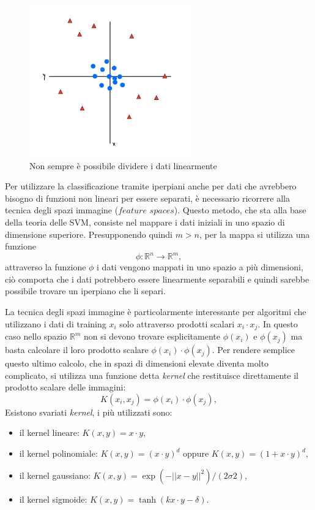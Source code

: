 \documentclass[12pt,italian]{report}
\begin{document}
\begin{figure}[h]
	\centering
	\includegraphics[width = 70mm]{immagini/nonLineare}
	\caption{Non sempre è possibile dividere i dati linearmente}
\end{figure}

Per utilizzare la classificazione tramite iperpiani anche per dati che avrebbero bisogno di funzioni non lineari per essere separati, è necessario ricorrere alla tecnica degli spazi immagine ($feature$ $spaces$). Questo metodo, che sta alla base della teoria delle SVM, consiste nel mappare i dati iniziali in uno spazio di dimensione superiore.  Presupponendo quindi $m > n$, per la mappa si utilizza una funzione
\begin{equation}
	\phi: \mathbb{R}^{n} \rightarrow \mathbb{R}^{m},
\end{equation}
attraverso la funzione $\phi$ i dati vengono mappati in uno spazio a più dimensioni, ciò comporta che i dati potrebbero essere linearmente separabili e quindi sarebbe possibile trovare un iperpiano che li separi. \cite{LectureNotesNg}

La tecnica degli spazi immagine è particolarmente interessante per algoritmi che utilizzano i dati di training $x_i$ solo attraverso prodotti scalari $x_i \cdot x_j$. In questo caso nello spazio $\mathbb{R}^{m}$ non si devono trovare esplicitamente $\phi(x_i)$ e $\phi (x_j)$ ma basta calcolare il loro prodotto scalare $\phi (x_i) \cdot \phi (x_j)$. Per rendere semplice questo ultimo calcolo, che in spazi di dimensioni elevate diventa molto complicato, si utilizza una funzione detta \textit{kernel} che restituisce direttamente il prodotto scalare delle immagini:
\begin{equation}
K(x_i, x_j) = \phi (x_i) \cdot \phi (x_j),
\end{equation}
Esistono svariati \textit{kernel}, i più utilizzati sono:
\begin{itemize}
	\item il kernel lineare: $K(x, y) = x \cdot y$,
	\item il kernel polinomiale: $K(x, y) = (x \cdot y)^{d}$ oppure $K(x, y) = (1 + x \cdot y)^{d}$,
	\item il kernel gaussiano: $K(x,y) = \exp (- \left || x-y \right || ^2)/(2 \sigma 2)$,
	\item il kernel sigmoide: $K(x,y) = \tanh(k x \cdot y - \delta)$.
\end{itemize}
\end{document}
